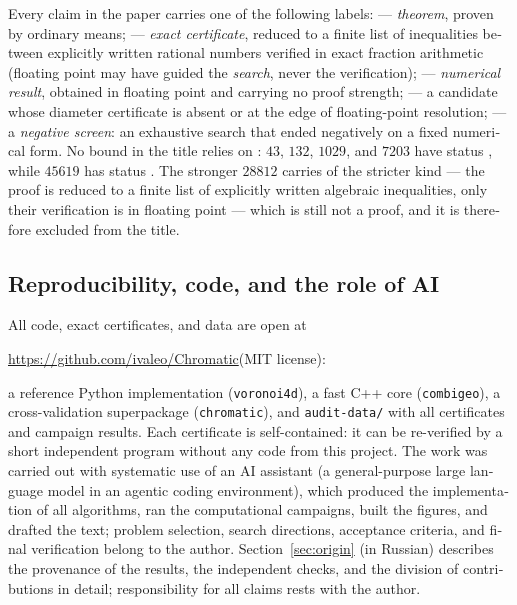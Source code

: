 \begin{otherlanguage}{english}
Every claim in the paper carries one of the following labels:
\stP{} --- \emph{theorem}, proven by ordinary means; \stC{} --- \emph{exact
certificate}, reduced to a finite list of inequalities between explicitly
written rational numbers verified in exact fraction arithmetic (floating
point may have guided the \emph{search}, never the verification); \stN{}
--- \emph{numerical result}, obtained in floating point and carrying no
proof strength; \stM{} --- a candidate whose diameter certificate is absent
or at the edge of floating-point resolution;
\textbf{\cyrbadge{[Э]}} --- a \emph{negative screen}: an exhaustive search that ended
negatively on a fixed numerical form. No bound in the title relies on
\stN: $43$, $132$, $1029$, and $7203$ have status \stC, while $45619$
has status \stP. The stronger $28812$ carries \stN{} of
the stricter kind --- the proof is reduced to a finite list of explicitly
written algebraic inequalities, only their verification is in floating
point --- which is still not a proof, and it is therefore excluded from
the title.

\subsection*{Reproducibility, code, and the role of AI}

All code, exact certificates, and data are open at
\begin{center}
\url{https://github.com/ivaleo/Chromatic}\quad(MIT license):
\end{center}
a reference Python implementation (\texttt{voronoi4d}), a fast C++ core
(\texttt{combigeo}), a cross-validation superpackage (\texttt{chromatic}),
and \texttt{audit-data/} with all certificates and campaign results. Each
certificate is self-contained: it can be re-verified by a short independent
program without any code from this project. The work was carried out with
systematic use of an AI assistant (a general-purpose large language model in
an agentic coding environment), which produced the implementation of all
algorithms, ran the computational campaigns, built the figures, and drafted
the text; problem selection, search directions,
acceptance criteria, and final verification belong to the author. Section~\ref{sec:origin}
(in Russian) describes the provenance of the results, the independent
checks, and the division of contributions in detail; responsibility for all
claims rests with the author.
\end{otherlanguage}
